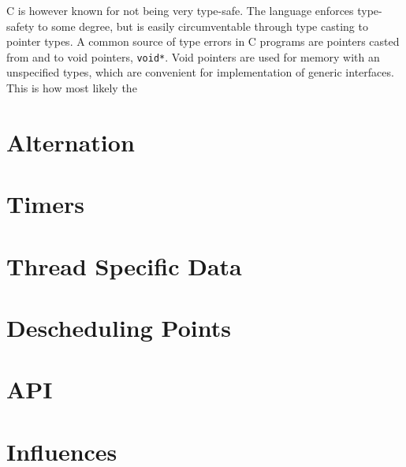 C is however known for not being very type\hyp{}safe. The language enforces type\hyp{}safety to some degree, but is easily circumventable through type casting to pointer types. A common source of type errors in C programs are pointers casted from and to void pointers, \texttt{void*}. Void pointers are used for memory with an unspecified types, which are convenient for implementation of generic interfaces. This is how most likely the 


\section{Alternation}




\section{Timers}



\section{Thread Specific Data}
\label{sec:thread_specific_data}




\section{Descheduling Points}




\section{API}




\section{Influences}



